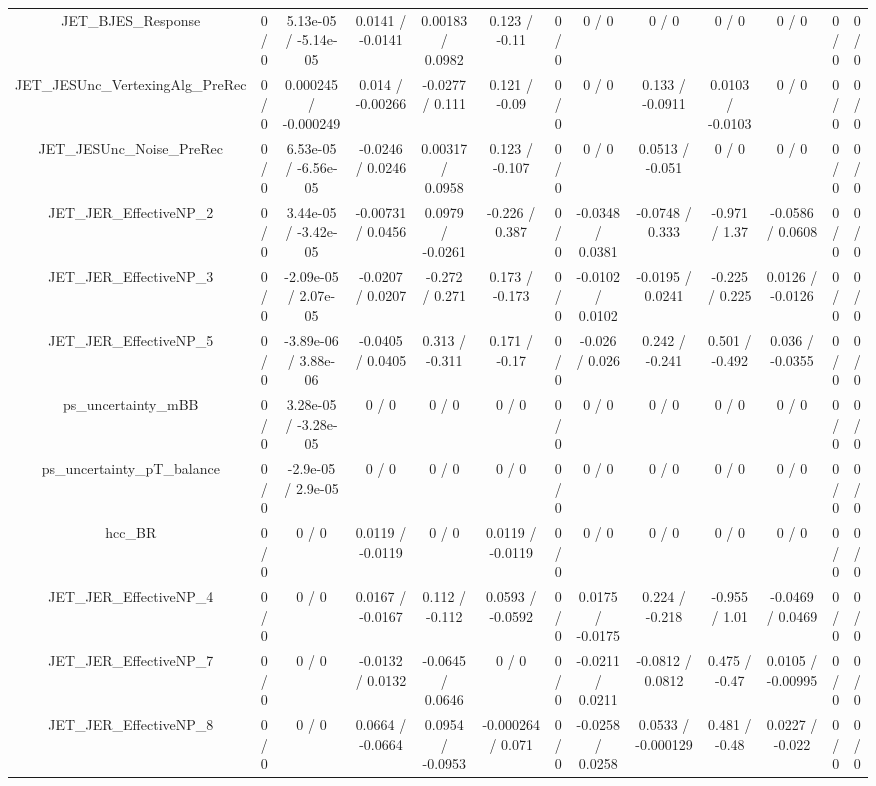 \documentclass[10pt]{article}
\begin{document}
\begin{table}[htbp]
\begin{center}
\begin{tabular}{|c|c|c|c|c|c|c|c|c|c|c|c|c|}
  JET_BJES_Response & 0 / 0 & 5.13e-05 / -5.14e-05 & 0.0141 / -0.0141 & 0.00183 / 0.0982 & 0.123 / -0.11 & 0 / 0 & 0 / 0 & 0 / 0 & 0 / 0 & 0 / 0 & 0 / 0 & 0 / 0 \\ 
  JET_JESUnc_VertexingAlg_PreRec & 0 / 0 & 0.000245 / -0.000249 & 0.014 / -0.00266 & -0.0277 / 0.111 & 0.121 / -0.09 & 0 / 0 & 0 / 0 & 0.133 / -0.0911 & 0.0103 / -0.0103 & 0 / 0 & 0 / 0 & 0 / 0 \\ 
  JET_JESUnc_Noise_PreRec & 0 / 0 & 6.53e-05 / -6.56e-05 & -0.0246 / 0.0246 & 0.00317 / 0.0958 & 0.123 / -0.107 & 0 / 0 & 0 / 0 & 0.0513 / -0.051 & 0 / 0 & 0 / 0 & 0 / 0 & 0 / 0 \\ 
  JET_JER_EffectiveNP_2 & 0 / 0 & 3.44e-05 / -3.42e-05 & -0.00731 / 0.0456 & 0.0979 / -0.0261 & -0.226 / 0.387 & 0 / 0 & -0.0348 / 0.0381 & -0.0748 / 0.333 & -0.971 / 1.37 & -0.0586 / 0.0608 & 0 / 0 & 0 / 0 \\ 
  JET_JER_EffectiveNP_3 & 0 / 0 & -2.09e-05 / 2.07e-05 & -0.0207 / 0.0207 & -0.272 / 0.271 & 0.173 / -0.173 & 0 / 0 & -0.0102 / 0.0102 & -0.0195 / 0.0241 & -0.225 / 0.225 & 0.0126 / -0.0126 & 0 / 0 & 0 / 0 \\ 
  JET_JER_EffectiveNP_5 & 0 / 0 & -3.89e-06 / 3.88e-06 & -0.0405 / 0.0405 & 0.313 / -0.311 & 0.171 / -0.17 & 0 / 0 & -0.026 / 0.026 & 0.242 / -0.241 & 0.501 / -0.492 & 0.036 / -0.0355 & 0 / 0 & 0 / 0 \\ 
  ps_uncertainty_mBB & 0 / 0 & 3.28e-05 / -3.28e-05 & 0 / 0 & 0 / 0 & 0 / 0 & 0 / 0 & 0 / 0 & 0 / 0 & 0 / 0 & 0 / 0 & 0 / 0 & 0 / 0 \\ 
  ps_uncertainty_pT_balance & 0 / 0 & -2.9e-05 / 2.9e-05 & 0 / 0 & 0 / 0 & 0 / 0 & 0 / 0 & 0 / 0 & 0 / 0 & 0 / 0 & 0 / 0 & 0 / 0 & 0 / 0 \\ 
  hcc_BR & 0 / 0 & 0 / 0 & 0.0119 / -0.0119 & 0 / 0 & 0.0119 / -0.0119 & 0 / 0 & 0 / 0 & 0 / 0 & 0 / 0 & 0 / 0 & 0 / 0 & 0 / 0 \\ 
  JET_JER_EffectiveNP_4 & 0 / 0 & 0 / 0 & 0.0167 / -0.0167 & 0.112 / -0.112 & 0.0593 / -0.0592 & 0 / 0 & 0.0175 / -0.0175 & 0.224 / -0.218 & -0.955 / 1.01 & -0.0469 / 0.0469 & 0 / 0 & 0 / 0 \\ 
  JET_JER_EffectiveNP_7 & 0 / 0 & 0 / 0 & -0.0132 / 0.0132 & -0.0645 / 0.0646 & 0 / 0 & 0 / 0 & -0.0211 / 0.0211 & -0.0812 / 0.0812 & 0.475 / -0.47 & 0.0105 / -0.00995 & 0 / 0 & 0 / 0 \\ 
  JET_JER_EffectiveNP_8 & 0 / 0 & 0 / 0 & 0.0664 / -0.0664 & 0.0954 / -0.0953 & -0.000264 / 0.071 & 0 / 0 & -0.0258 / 0.0258 & 0.0533 / -0.000129 & 0.481 / -0.48 & 0.0227 / -0.022 & 0 / 0 & 0 / 0 \\ 

\end{tabular}
\end{center}
\end{table}
\end{document}
